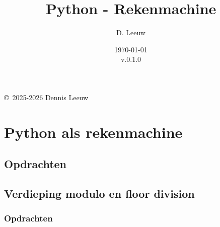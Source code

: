 \documentclass[a4paper,12pt,twoside,openright,titlepage]{article}
\author{D. Leeuw}
\title{Python - Rekenmachine}
\date{\today\\v.0.1.0}
\begin{document}

\maketitle

\copyright\ 2025-2026 Dennis Leeuw\\





\section{Python als rekenmachine}

\subsection{Opdrachten}

\subsection{Verdieping modulo en floor division}

\subsubsection{Opdrachten}


\printindex
\end{document}
